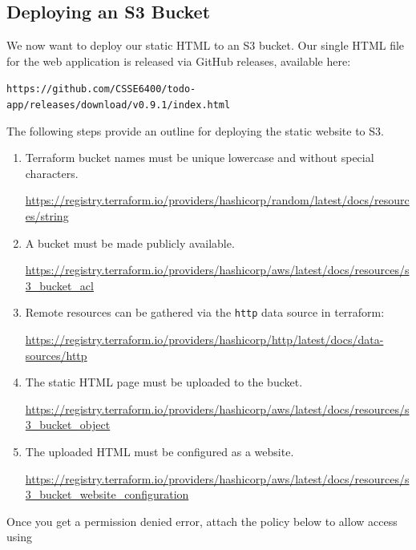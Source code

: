 \documentclass{csse4400}
\begin{document}
\subsection{Deploying an S3 Bucket}
We now want to deploy our static HTML to an S3 bucket.
Our single HTML file for the web application is released via GitHub releases, available here:

\noindent\texttt{https://github.com/CSSE6400/todo-app/releases/download/v0.9.1/index.html}

\noindent The following steps provide an outline for deploying the static website to S3.

\begin{enumerate}
  \item Terraform bucket names must be unique lowercase and without special characters.
  
  \url{https://registry.terraform.io/providers/hashicorp/random/latest/docs/resources/string}

  \item A bucket must be made publicly available.
  
  \url{https://registry.terraform.io/providers/hashicorp/aws/latest/docs/resources/s3_bucket_acl}

  \item Remote resources can be gathered via the \texttt{http} data source in terraform: 
  
  \url{https://registry.terraform.io/providers/hashicorp/http/latest/docs/data-sources/http}

  \item The static HTML page must be uploaded to the bucket.
  
  \url{https://registry.terraform.io/providers/hashicorp/aws/latest/docs/resources/s3_bucket_object}

  \item The uploaded HTML must be configured as a website.
  
  \url{https://registry.terraform.io/providers/hashicorp/aws/latest/docs/resources/s3_bucket_website_configuration}
\end{enumerate}

\noindent Once you get a permission denied error,
attach the policy below to allow access using 

\end{document}
